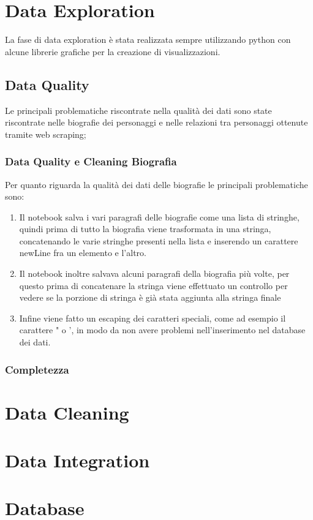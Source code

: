 \documentclass[
10pt, %
a4paper, %
oneside, %
headinclude,footinclude, %
BCOR5mm, %
]{scrartcl}
\begin{document}
\section{Data Exploration}
La fase di data exploration è stata realizzata sempre utilizzando python con alcune librerie grafiche per la creazione di visualizzazioni.

\subsection{Data Quality}
Le principali problematiche riscontrate nella qualità dei dati sono state riscontrate nelle biografie dei personaggi e nelle relazioni tra personaggi ottenute tramite web scraping;
\subsubsection{Data Quality e Cleaning Biografia}
Per quanto riguarda la qualità dei dati delle biografie le principali problematiche sono:
\begin{enumerate}
	\item Il notebook salva i vari paragrafi delle biografie come una lista di stringhe, quindi prima di tutto la biografia viene trasformata in una stringa, concatenando le varie stringhe presenti nella lista e inserendo un carattere newLine fra un elemento e l'altro.
	\item Il notebook inoltre salvava alcuni paragrafi della biografia più volte, per questo prima di concatenare la stringa viene effettuato un controllo per vedere se la porzione di stringa è già stata aggiunta alla stringa finale
	\item Infine viene fatto un escaping dei caratteri speciali, come ad esempio il carattere " o ', in modo da non avere problemi nell'inserimento nel database dei dati.
\end{enumerate}
\subsubsection{Completezza}
\section{Data Cleaning}
\section{Data Integration}
\section{Database}
\
\end{document}
